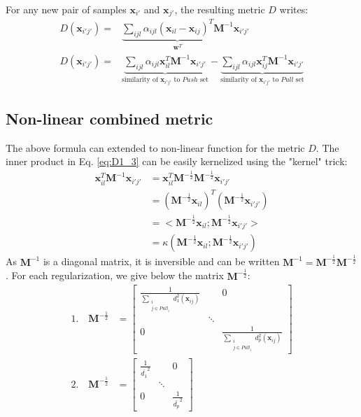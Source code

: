 \noindent For any new pair of samples $\textbf{x}_{i'}$ and $\textbf{x}_{j'}$, the resulting metric $D$ writes: 
\begin{align}
	D(\textbf{x}_{i'j'}) = & 
	\underbrace{
		\sum\limits_{ijl} \alpha_{ijl} 
		(\textbf{x}_{il}-\textbf{x}_{ij})^T
		\textbf{M}^{-1}
	}_{\textbf{w}^T}
	\textbf{x}_{i'j'}
	\label{eq:D1_2} \\
	D(\textbf{x}_{i'j'}) = & 
	\underbrace{
		\sum\limits_{ijl} \alpha_{ijl} 
		\textbf{x}_{il}^T \textbf{M}^{-1}	\textbf{x}_{i'j'}
	}_{\text{similarity of $\textbf{x}_{i'j'}$ to $Push$ set}}
	- 
	\underbrace{
		\sum\limits_{ijl} \alpha_{ijl} 
		\textbf{x}_{ij}^T \textbf{M}^{-1}	\textbf{x}_{i'j'}
	}_{\text{similarity of $\textbf{x}_{i'j'}$ to $Pull$ set}}
	\label{eq:D1_3}	
\end{align}

\subsection{Non-linear combined metric}
The above formula can extended to non-linear function for the metric $D$. The inner product in Eq. \ref{eq:D1_3} can be easily kernelized using the "kernel" trick:
\begin{align}
	\textbf{x}_{il}^T \textbf{M}^{-1} \textbf{x}_{i'j'}
	& = \textbf{x}_{il}^T \textbf{M}^{-\frac{1}{2}} \textbf{M}^{-\frac{1}{2}} \textbf{x}_{i'j'}	\nonumber	\\
	& = \left( \textbf{M}^{-\frac{1}{2}} \textbf{x}_{il} \right)^T \left( \textbf{M}^{-\frac{1}{2}} \textbf{x}_{i'j'} \right) \nonumber \\
	& = <\textbf{M}^{-\frac{1}{2}} \textbf{x}_{il} ; \textbf{M}^{-\frac{1}{2}} \textbf{x}_{i'j'} > \nonumber \\
	& = \kappa(\textbf{M}^{-\frac{1}{2}} \textbf{x}_{il} ;  \textbf{M}^{-\frac{1}{2}} \textbf{x}_{i'j'} ) \nonumber
\end{align}
As $\textbf{M}^{-1}$ is a diagonal matrix, it is inversible and can be written $\textbf{M}^{-1} = \textbf{M}^{-\frac{1}{2}} \textbf{M}^{-\frac{1}{2}}$. For each regularization, we give below the matrix $\textbf{M}^{-\frac{1}{2}}$:
\begin{align}
1. \quad \textbf{M}^{-\frac{1}{2}} &= 
\begin{bmatrix} 
\frac{1}{\sum\limits_{\substack{i \\ j \in Pull_i}} d_1^2(\textbf{x}_{ij})} 		&  	& 0 \\ 
& \ddots 	&  \\ 
0 		&  	& 
\frac{1}{\sum\limits_{\substack{i \\ j \in Pull_i}} d_p^2(\textbf{x}_{ij})}
\end{bmatrix} \label{eq:M_12} \\
2. \quad \textbf{M}^{-\frac{1}{2}} &= 
\begin{bmatrix} 
\frac{1}{\bar{d_1}^2} &  	& 0 \\ 
& \ddots 	&  \\ 
0 		&  	& \frac{1}{\bar{d_p}^2}
\end{bmatrix} \label{eq:M_22}
\end{align}

